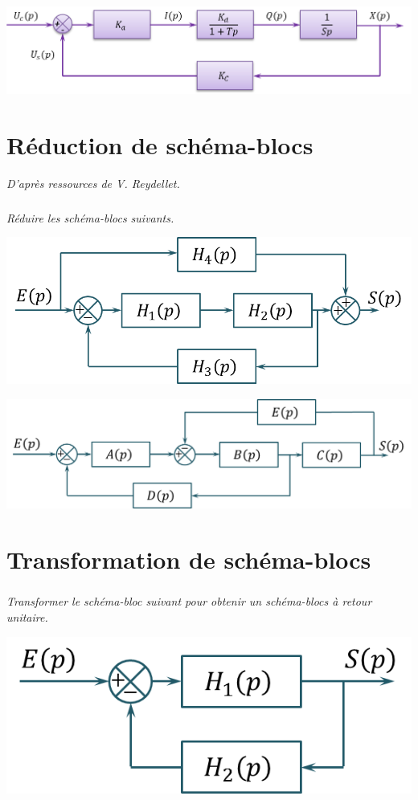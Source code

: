 \documentclass[10pt,fleqn]{article} %
\begin{document}
\begin{multicols}{2}
\begin{corrige}
\begin{center}
\includegraphics[width=.8\textwidth]{images/schema_bloc}
\end{center}
\end{corrige}
\else 
\fi




\section*{Réduction de schéma-blocs}
\textit{D'après ressources de V. Reydellet.}
\subparagraph*{}
\textit{Réduire les schéma-blocs suivants.}
\begin{center}
\includegraphics[scale=.2]{images/sb_01}
\end{center}

\begin{center}
\includegraphics[scale=.2]{images/sb_02}
\end{center}

\section*{Transformation de schéma-blocs}
\subparagraph*{}
\textit{Transformer le schéma-bloc suivant pour obtenir un schéma-blocs à retour unitaire.}
\begin{center}
\includegraphics[scale=.2]{images/sb_03}
\end{center}


\end{multicols}
\end{document}
